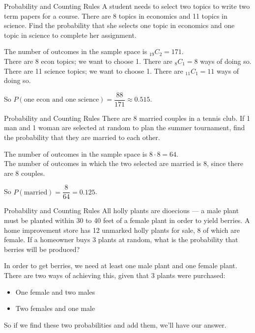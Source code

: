 \documentclass[t, aspectratio=169]{beamer}
\newcommand{\?}{\stackrel{?}{=}}
\begin{document}
	\begin{frame}{Probability and Counting Rules}
		A student needs to select two topics to write two term papers for a course. There are 8 topics in economics and 11 topics in science. Find the probability that she selects one topic in economics and one topic in science to complete her assignment. \pause
		
		The number of outcomes in the sample space is $_{19} C _2 = 171$. \pause \\
		There are 8 econ topics; we want to choose 1. There are $_8 C _1 = 8$ ways of doing so. \pause \\
		There are 11 science topics; we want to choose 1. There are $_{11} C _1 = 11$ ways of doing so. \pause
		
		So $P(\text{one econ and one science}) = \dfrac{88}{171} \approx 0.515$.
	\end{frame}

	\begin{frame}{Probability and Counting Rules}
		There are 8 married couples in a tennis club. If 1 man and 1 woman are selected at random to plan the summer tournament, find the probability that they are married to each other. \pause
		
		The number of outcomes in the sample space is $8 \cdot 8 = 64$. \pause \\
		The number of outcomes in which the two selected are married is 8, since there are 8 couples. \pause
		
		So $P(\text{married}) = \dfrac{8}{64} = 0.125$.
	\end{frame}

	\begin{frame}{Probability and Counting Rules}
		All holly plants are dioecious --- a male plant must be planted within 30 to 40 feet of a female plant in order to yield berries. A home improvement store has 12 unmarked holly plants for sale, 8 of which are female. If a homeowner buys 3 plants at random, what is the probability that berries will be produced? \pause
		
		In order to get berries, we need at least one male plant and one female plant. There are two ways of achieving this, given that 3 plants were purchased: \pause \begin{itemize}
			\item One female and two males
			\item Two females and one male
		\end{itemize} \pause
		So if we find these two probabilities and add them, we'll have our answer.
	\end{frame}
\end{document}
